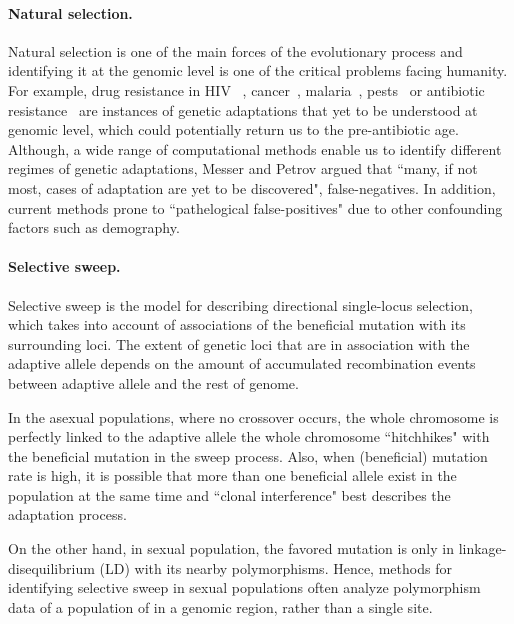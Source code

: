 \documentclass[11pt]{article}
\begin{document}
\paragraph{Natural selection.} Natural selection is one of the main forces of 
the evolutionary 
process and 
identifying it at the genomic level is one of the critical problems facing 
humanity.
For example, drug resistance in HIV ~\cite{Feder2016More}, 
cancer~\cite{gottesman2002mechanisms,zahreddine2013mechanisms},
malaria~\cite{ariey2014molecular,nair2007recurrent},
pests~\cite{daborn2001ddt} or antibiotic 
resistance~\cite{spellberg2008epidemic} are instances of genetic adaptations 
that yet to be 
understood at genomic level, which could potentially return us to the 
pre-antibiotic age.
Although, a wide range of computational methods \cite{vitti2013detecting} 
enable us to identify different regimes of genetic adaptations, Messer 
and Petrov 
\cite{messer2013population} argued that ``many, if not most, cases of 
adaptation are yet to be discovered", false-negatives. In addition, current 
methods prone to ``pathelogical false-positives" due to other confounding 
factors such as demography.


\paragraph{Selective sweep.} Selective sweep 
\cite{smith1974hitch,kaplan1989hitchhiking} is the 
model for describing directional single-locus selection, which takes into 
account of associations of the beneficial mutation with its surrounding loci.
The extent of genetic loci that are in association with the adaptive allele 
depends on the amount of accumulated recombination events between adaptive 
allele and the rest of genome. 

In the asexual populations, where no 
crossover occurs, the whole chromosome is perfectly linked to the 
adaptive allele the whole chromosome ``hitchhikes" with the beneficial mutation in 
the sweep process.
Also, when (beneficial) mutation rate is high, it is possible that more than 
one beneficial allele exist in the population at the same time and ``clonal 
interference" \cite{desai2007beneficial,lang2013pervasive} 
best describes the adaptation process.

On the other hand, in sexual population, the favored mutation is only in 
linkage-disequilibrium (LD) with its nearby polymorphisms. Hence, methods for 
identifying selective 
sweep in sexual populations often analyze  polymorphism data of a population of 
in a genomic region, rather than a single site. 
\end{document}
